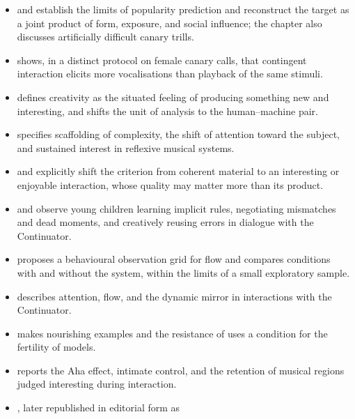 \documentclass[11pt,a4paper]{article}
\begin{document}
\begin{itemize}
        between timbral similarity and textual expectation.
  \item \textcite{pachetroy2008hitsong} and \textcite{pachet2011hitsong}
        establish the limits of popularity prediction and reconstruct the target
        as a joint product of form, exposure, and social influence; the chapter
        also discusses artificially difficult canary trills.
  \item \textcite{lerch2011closedloop} shows, in a distinct protocol on female
        canary calls, that contingent interaction elicits more vocalisations than
        playback of the same stimuli.
  \item \textcite{pachet2006creativity} defines creativity as the situated feeling
        of producing something new and interesting, and shifts the unit of analysis
        to the human--machine pair.
  \item \textcite{pachet2006reflective} specifies scaffolding of complexity, the
        shift of attention toward the subject, and sustained interest in reflexive
        musical systems.
  \item \textcite{pachet2004cybernetic} and
        \textcite{pachet2006interactionsreflexives} explicitly shift the criterion
        from coherent material to an interesting or enjoyable interaction, whose
        quality may matter more than its product.
  \item \textcite{pachet2004childrenreflect} and
        \textcite{addessi2005experiments} observe young children learning implicit
        rules, negotiating mismatches and dead moments, and creatively reusing errors
        in dialogue with the Continuator.
  \item \textcite{addessi2006flowmachine} proposes a behavioural observation grid
        for flow and compares conditions with and without the system, within the
        limits of a small exploratory sample.
  \item \textcite{pachet2004flowmachines} describes attention, flow, and the
        dynamic mirror in interactions with the Continuator.
  \item \textcite{pachet2004reification} makes nourishing examples and the
        resistance of uses a condition for the fertility of models.
  \item \textcite{pachet2002continuatorinteraction} reports the Aha effect,
        intimate control, and the retention of musical regions judged interesting
        during interaction.
  \item \textcite{pachet2000melodie}, later republished in editorial form as

\end{itemize}
\end{document}
